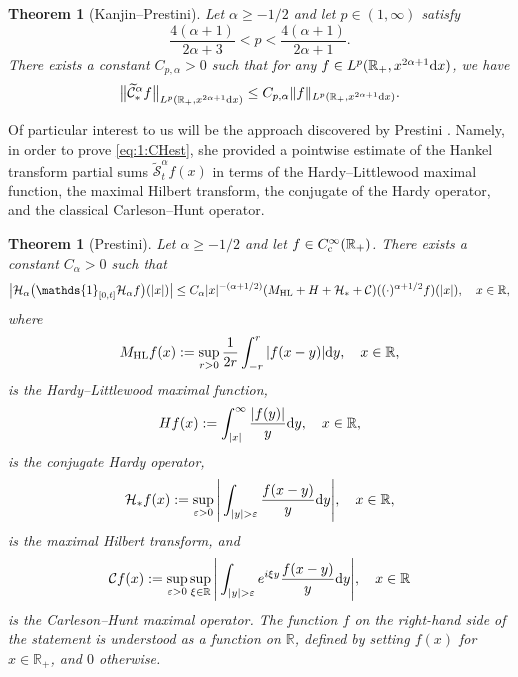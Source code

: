 \documentclass[11pt,oneside]{amsart}
\numberwithin{equation}{section}
\newtheorem{theorem}[equation]{Theorem}
\theoremstyle{definition}
\newcommand{\RR}{\mathbb{R}}
\newcommand{\calC}{\mathcal{C}}
\newcommand{\calH}{\mathcal{H}}
\newcommand{\calS}{\mathcal{S}}
\begin{document}
\begin{theorem}[Kanjin--Prestini]\label{thmKP}
Let $\alpha\geq-1/2$ and let $p\in(1,\infty)$ satisfy
 \begin{equation}
     \frac{4(\alpha+1)}{2\alpha+3}<p<\frac{4(\alpha+1)}{2\alpha+1}.
 \end{equation}
There exists a constant $C_{p,\alpha}>0$ such that for any $f\in L^p(\mathbb{R}_+,x^{2\alpha+1}{\rm d}x)$, we have
\begin{equation}\label{eq:1:CHest}
    \big\|\widetilde{\calC}_{\ast}^\alpha f\big\|_{L^p(\RR_+,x^{2\alpha+1}{\rm d}x)}\leq C_{p,\alpha}\|f\|_{L^p(\RR_+,x^{2\alpha+1}{\rm d}x)}.
\end{equation}
\end{theorem}
Of particular interest to us will be the approach discovered by Prestini \cite{Prestini88}. Namely, in order to prove \eqref{eq:1:CHest}, she provided a pointwise estimate of the Hankel transform partial sums $\widetilde{\calS}_{t}^\alpha f(x)$ in terms of the Hardy--Littlewood maximal function, the maximal Hilbert transform, the conjugate of the Hardy operator, and the classical Carleson--Hunt operator.
\begin{theorem}[Prestini]\label{thm:Prestini}
Let $\alpha\geq-1/2$ and let $f\in C_{\rm c}^\infty(\RR_+)$. There exists a constant $C_\alpha>0$ such that
\begin{equation*}
\big|\calH_{\alpha}\big(\mathds{1}_{[0,t]}\calH_\alpha f\big)(|x|)\big|\leq C_\alpha |x|^{-(\alpha+1/2)}(M_{\rm HL}+H+\calH_\ast+\calC)((\cdot)^{\alpha+1/2}f)(|x|),\quad x\in\RR,
 \end{equation*}
 where
\begin{equation}\label{eq:2:HL}
    M_{\rm HL}f(x):=\sup_{r>0}\frac{1}{2r}\int_{-r}^r |f(x-y)|{\rm d}y,\quad x\in\RR,
\end{equation}
is the Hardy--Littlewood maximal function,
\begin{equation}\label{eq:3:H}
    Hf(x):=\int_{|x|}^\infty\frac{|f(y)|}{y}{\rm d}y,\quad x\in\RR,
\end{equation}
is the conjugate Hardy operator,
\begin{equation}\label{eq:4:Hilb}
    \calH_\ast f(x):=\sup_{\varepsilon>0}\Bigg|\int_{|y|>\varepsilon}\frac{f(x-y)}{y}{\rm d}y\Bigg|,\quad x\in\RR,
\end{equation}
is the maximal Hilbert transform, and
\begin{equation}\label{eq:5:CH}
    \calC f(x):=\sup_{\varepsilon>0}\sup_{\xi\in\RR}\Bigg|\int_{|y|>\varepsilon}{e^{i\xi y}}\frac{f(x-y)}{y}{\rm d}y\Bigg|,\quad x\in\RR
\end{equation}
is the Carleson--Hunt maximal operator. The function \( f \) on the right-hand side of the statement is understood as a function on \( \mathbb{R} \), defined by setting \( f(x) \) for \( x \in \mathbb{R}_+ \), and \( 0 \) otherwise.

\end{theorem}
\end{document}
